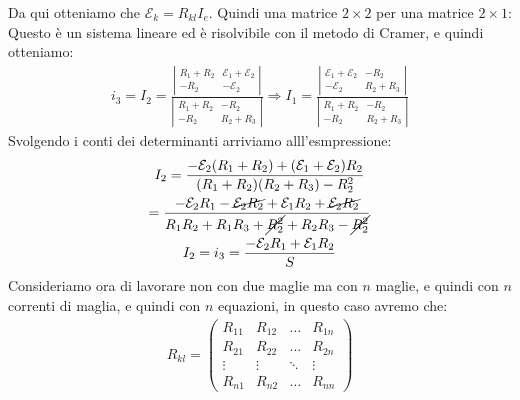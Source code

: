 \documentclass[a4paper, oneside]{article}
\begin{document}
Da qui otteniamo che $\mathcal{E}_k = R_{kl} I_e$. Quindi una matrice $2\times2$ per una matrice $2\times1$:\\
Questo è un sistema lineare ed è risolvibile con il metodo di Cramer, e quindi otteniamo:
\begin{gather*}
    i_3 = I_2 = \frac{\left\lvert \begin{matrix}
        R_1 + R_2 & \mathcal{E}_1 + \mathcal{E}_2\\
        -R_2 & -\mathcal{E}_2
    \end{matrix} \right\rvert }{\left\lvert \begin{matrix}
        R_1 + R_2 & -R_2\\
        -R_2 & R_2 + R_3
    \end{matrix} \right\rvert }
    \Rightarrow I_1 = \frac{\left\lvert \begin{matrix}
        \mathcal{E}_1 + \mathcal{E}_2 & -R_2\\
        -\mathcal{E}_2 & R_2 + R_3
    \end{matrix} \right\rvert }{\left\lvert \begin{matrix}
        R_1 + R_2 & -R_2\\
        -R_2 & R_2 + R_3
    \end{matrix} \right\rvert }
\end{gather*}
Svolgendo i conti dei determinanti arriviamo alll'esmpressione:
\begin{gather*}
    I_2 = \frac{-\mathcal{E}_2(R_1 + R_2) + (\mathcal{E}_1 + \mathcal{E}_2)R_2}{(R_1 + R_2)(R_2 + R_3) - R_2^2}\\
    = \frac{-\mathcal{E}_2 R_1 - \cancel{\mathcal{E}_2 R_2} + \mathcal{E}_1 R_2 + \cancel{\mathcal{E}_2 R_2}}{R_1 R_2 + R_1 R_3 + \cancel{R_2^2} + R_2 R_3 - \cancel{R_2^2}}\\
    I_2 = i_3 = \frac{-\mathcal{E}_2 R_1 + \mathcal{E}_1 R_2}{S}
\end{gather*}
Consideriamo ora di lavorare non con due maglie ma con $n$ maglie, e quindi con $n$ correnti di maglia, e quindi con $n$ equazioni, in questo caso avremo che:
\begin{gather*}
    R_{kl} = \begin{pmatrix}
        R_{11} & R_{12} & \dots & R_{1n}\\
        R_{21} & R_{22} & \dots & R_{2n}\\
        \vdots & \vdots & \ddots & \vdots\\
        R_{n1} & R_{n2} & \dots & R_{nn}
    \end{pmatrix}
\end{gather*}
\end{document}
